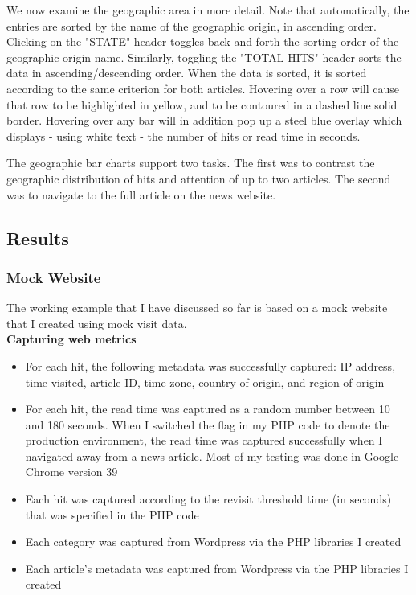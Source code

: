 \documentclass[12pt]{article}
\begin{document}
{\noindent We now examine the geographic area in more detail. Note that automatically, the entries are sorted by the name of the geographic origin, in ascending order. Clicking on the "STATE" header toggles back and forth the sorting order of the geographic origin name. Similarly, toggling the "TOTAL HITS" header sorts the data in ascending/descending order. When the data is sorted, it is sorted according to the same criterion for both articles. Hovering over a row will cause that row to be highlighted in yellow, and to be contoured in a dashed line solid border. Hovering over any bar will in addition pop up a steel blue overlay which displays - using white text - the number of hits or read time in seconds.  

\noindent The geographic bar charts support two tasks. The first was to contrast the geographic distribution of hits and attention of up to two articles. The second was to navigate to the full article on the news website. 

\newpage

\subsection{Results}

\subsubsection{Mock Website}
The working example that I have discussed so far is based on a mock website that I created using mock visit data. \\

\noindent\textbf{Capturing web metrics}
\begin{itemize}
\item For each hit, the following metadata was successfully captured: IP address, time visited, article ID, time zone, country of origin, and region of origin
\item For each hit, the read time was captured as a random number between 10 and 180 seconds. When I switched the flag in my PHP code to denote the production environment, the read time was captured successfully when I navigated away from a news article. Most of my testing was done in Google Chrome version 39
\item Each hit was captured according to the revisit threshold time (in seconds) that was specified in the PHP code
\item Each category was captured from Wordpress via the PHP libraries I created
\item Each article's metadata was captured from Wordpress via the PHP libraries I created
\end{itemize}

}
\end{document}
